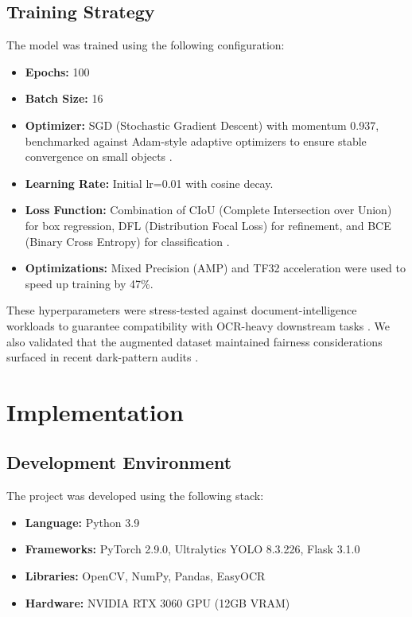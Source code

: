 \documentclass[11pt,a4paper]{report}
\begin{document}
\section{Training Strategy}
The model was trained using the following configuration:
\begin{itemize}
    \item \textbf{Epochs:} 100
    \item \textbf{Batch Size:} 16
    \item \textbf{Optimizer:} SGD (Stochastic Gradient Descent) with momentum 0.937, benchmarked against Adam-style adaptive optimizers to ensure stable convergence on small objects \cite{adam}.
    \item \textbf{Learning Rate:} Initial lr=0.01 with cosine decay.
    \item \textbf{Loss Function:} Combination of CIoU (Complete Intersection over Union) for box regression, DFL (Distribution Focal Loss) for refinement, and BCE (Binary Cross Entropy) for classification \cite{ciou} \cite{focalloss}.
    \item \textbf{Optimizations:} Mixed Precision (AMP) and TF32 acceleration were used to speed up training by 47\%.
\end{itemize}
These hyperparameters were stress-tested against document-intelligence workloads to guarantee compatibility with OCR-heavy downstream tasks \cite{unifiedtext}\cite{omniparser}. We also validated that the augmented dataset maintained fairness considerations surfaced in recent dark-pattern audits \cite{darkpatterns}.

\chapter{Implementation}

\section{Development Environment}
The project was developed using the following stack:
\begin{itemize}
    \item \textbf{Language:} Python 3.9
    \item \textbf{Frameworks:} PyTorch 2.9.0, Ultralytics YOLO 8.3.226, Flask 3.1.0 \cite{pytorch}
    \item \textbf{Libraries:} OpenCV, NumPy, Pandas, EasyOCR \cite{opencv} \cite{easyocr}
    \item \textbf{Hardware:} NVIDIA RTX 3060 GPU (12GB VRAM)
\end{itemize}
\end{document}
